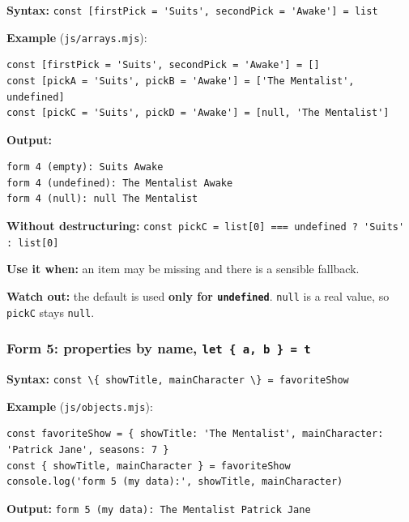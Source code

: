 \documentclass[
  10pt,
]{article}
\newcommand{\passthrough}[1]{#1}
\begin{document}
\textbf{Syntax:}
\passthrough{\lstinline!const [firstPick = 'Suits', secondPick = 'Awake'] = list!}

\textbf{Example} (\passthrough{\lstinline!js/arrays.mjs!}):

\begin{lstlisting}
const [firstPick = 'Suits', secondPick = 'Awake'] = []
const [pickA = 'Suits', pickB = 'Awake'] = ['The Mentalist', undefined]
const [pickC = 'Suits', pickD = 'Awake'] = [null, 'The Mentalist']
\end{lstlisting}

\textbf{Output:}

\begin{lstlisting}
form 4 (empty): Suits Awake
form 4 (undefined): The Mentalist Awake
form 4 (null): null The Mentalist
\end{lstlisting}

\textbf{Without destructuring:}
\passthrough{\lstinline!const pickC = list[0] === undefined ? 'Suits' : list[0]!}

\textbf{Use it when:} an item may be missing and there is a sensible
fallback.

\textbf{Watch out:} the default is used \textbf{only for
\passthrough{\lstinline!undefined!}}. \passthrough{\lstinline!null!} is
a real value, so \passthrough{\lstinline!pickC!} stays
\passthrough{\lstinline!null!}.

\hypertarget{form-5-properties-by-name-let-a-b-t}{%
\subsubsection{\texorpdfstring{Form 5: properties by name,
\texttt{let\ \{\ a,\ b\ \}\ =\ t}}{Form 5: properties by name, let \{ a, b \} = t}}\label{form-5-properties-by-name-let-a-b-t}}

\textbf{Syntax:}
\passthrough{\lstinline!const \{ showTitle, mainCharacter \} = favoriteShow!}

\textbf{Example} (\passthrough{\lstinline!js/objects.mjs!}):

\begin{lstlisting}
const favoriteShow = { showTitle: 'The Mentalist', mainCharacter: 'Patrick Jane', seasons: 7 }
const { showTitle, mainCharacter } = favoriteShow
console.log('form 5 (my data):', showTitle, mainCharacter)
\end{lstlisting}

\textbf{Output:}
\passthrough{\lstinline!form 5 (my data): The Mentalist Patrick Jane!}
\end{document}
